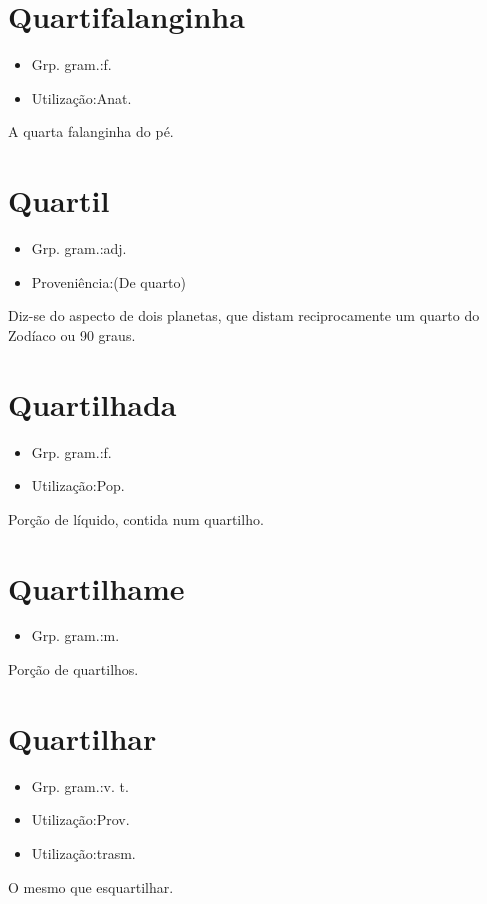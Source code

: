\section{Quartifalanginha}
\begin{itemize}
\item {Grp. gram.:f.}
\end{itemize}
\begin{itemize}
\item {Utilização:Anat.}
\end{itemize}
A quarta falanginha do pé.
\section{Quartil}
\begin{itemize}
\item {Grp. gram.:adj.}
\end{itemize}
\begin{itemize}
\item {Proveniência:(De \textunderscore quarto\textunderscore )}
\end{itemize}
Diz-se do aspecto de dois planetas, que distam reciprocamente um quarto do Zodíaco ou 90 graus.
\section{Quartilhada}
\begin{itemize}
\item {Grp. gram.:f.}
\end{itemize}
\begin{itemize}
\item {Utilização:Pop.}
\end{itemize}
Porção de líquido, contida num quartilho.
\section{Quartilhame}
\begin{itemize}
\item {Grp. gram.:m.}
\end{itemize}
Porção de quartilhos.
\section{Quartilhar}
\begin{itemize}
\item {Grp. gram.:v. t.}
\end{itemize}
\begin{itemize}
\item {Utilização:Prov.}
\end{itemize}
\begin{itemize}
\item {Utilização:trasm.}
\end{itemize}
O mesmo que \textunderscore esquartilhar\textunderscore .
